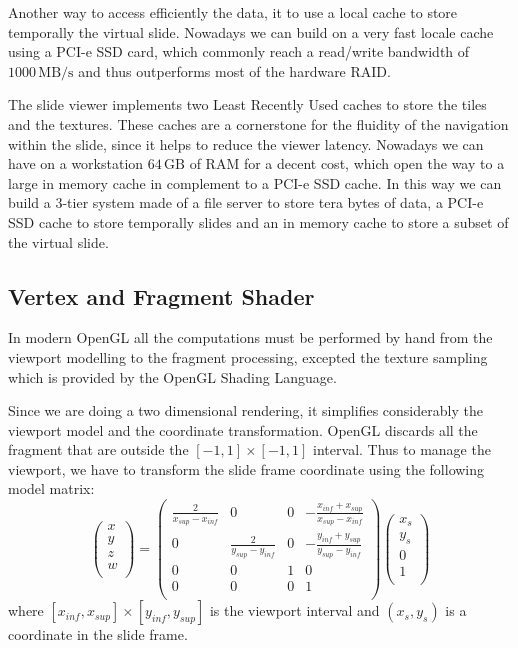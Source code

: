 \documentclass[letterpaper,compsoc,twoside]{IEEEtran}
\begin{document}
Another way to access efficiently the data, it to use a local cache to store temporally the virtual
slide. Nowadays we can build on a very fast locale cache using a PCI-e SSD card, which commonly
reach a read/write bandwidth of $1000\,\text{MB/s}$ and thus outperforms most of the hardware
RAID.

The slide viewer implements two Least Recently Used caches to store the tiles and the
textures. These caches are a cornerstone for the fluidity of the navigation within the slide, since
it helps to reduce the viewer latency. Nowadays we can have on a workstation
$64\,\text{GB}$ of RAM for a decent cost, which open the way to a large in memory cache in
complement to a PCI-e SSD cache. In this way we can build a 3-tier system made of a file server to
store tera bytes of data, a PCI-e SSD cache to store temporally slides and an in memory cache to
store a subset of the virtual slide.

\subsection{Vertex and Fragment Shader\label{vertex-and-fragment-shader}}


In modern OpenGL all the computations must be performed by hand from the viewport modelling to the
fragment processing, excepted the texture sampling which is provided by the OpenGL Shading Language.

Since we are doing a two dimensional rendering, it simplifies considerably the viewport model and
the coordinate transformation. OpenGL discards all the fragment that are outside the
$[-1,1]\times[-1,1]$ interval. Thus to manage the viewport, we have to transform the slide
frame coordinate using the following model matrix:\begin{equation}
\label{viewport matrix}
\left(\begin{array}{c}
x \\
y \\
z \\
w \\
\end{array}\right)
=
\left(\begin{array}{cccc}
\frac{2}{x_{sup} - x_{inf}} & 0 & 0 & -\frac{x_{inf} + x_{sup}}{x_{sup} - x_{inf}} \\
0 & \frac{2}{y_{sup} - y_{inf}} & 0 & -\frac{y_{inf} + y_{sup}}{y_{sup} - y_{inf}} \\
0 & 0 & 1 & 0 \\
0 & 0 & 0 & 1 \\
\end{array}\right)
\left(\begin{array}{c}
x_s \\
y_s \\
0 \\
1 \\
\end{array}\right)
\end{equation}where $[x_{inf},x_{sup}]\times[y_{inf},y_{sup}]$ is the viewport interval and
$(x_s,y_s)$ is a coordinate in the slide frame.
\end{document}
